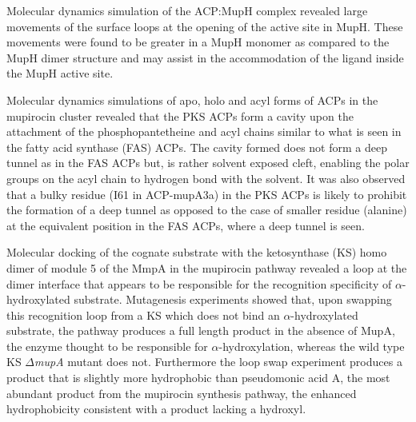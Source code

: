 Molecular dynamics simulation of the ACP:MupH complex revealed large movements of the surface loops at the opening of the active site in MupH. These movements were found to be greater in a MupH monomer as compared to the MupH dimer structure and may assist in the accommodation of the ligand inside the MupH active site. 

Molecular dynamics simulations of apo, holo and acyl forms of ACPs in the mupirocin cluster revealed that the PKS ACPs form a cavity upon the attachment of the phosphopantetheine and acyl chains similar to what is seen in the fatty acid synthase (FAS) ACPs. The cavity formed does not form a deep tunnel as in the FAS ACPs but, is rather solvent exposed cleft, enabling the polar groups on the acyl chain to hydrogen bond with the solvent. It was also observed that a bulky residue (I61 in ACP-mupA3a) in the PKS ACPs is likely to  prohibit the formation of a deep tunnel as opposed to the case of smaller residue (alanine) at the equivalent position in the FAS ACPs, where a deep tunnel is seen.

Molecular docking of the cognate substrate with the ketosynthase (KS) homo dimer of module 5 of the MmpA in the mupirocin pathway revealed a loop at the dimer interface that appears to be responsible for the recognition specificity of $ \alpha $-hydroxylated substrate. Mutagenesis experiments showed that, upon swapping this recognition loop from a KS which does not bind an $ \alpha $-hydroxylated substrate, the pathway produces a full length product in the absence of MupA, the enzyme thought to be responsible for $ \alpha $-hydroxylation, whereas the wild type KS $ \Delta $\textit{mupA} mutant does not. Furthermore the loop swap experiment produces a product that is slightly more hydrophobic than pseudomonic acid A, the most abundant product from the mupirocin synthesis pathway, the enhanced hydrophobicity consistent with a product lacking a hydroxyl.

